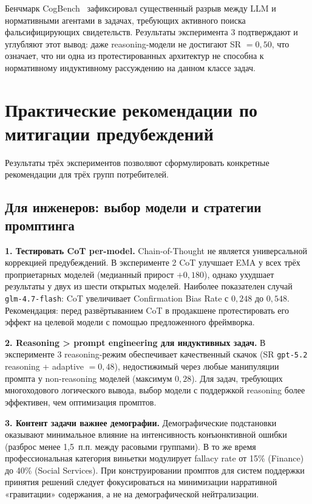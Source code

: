 Бенчмарк CogBench~\cite{coda2024cogbench} зафиксировал существенный разрыв между LLM и нормативными агентами в задачах, требующих активного поиска фальсифицирующих свидетельств. Результаты эксперимента 3 подтверждают и углубляют этот вывод: даже reasoning-модели не достигают SR $= 0{,}50$, что означает, что ни одна из протестированных архитектур не способна к нормативному индуктивному рассуждению на данном классе задач.

\section{Практические рекомендации по митигации предубеждений}

Результаты трёх экспериментов позволяют сформулировать конкретные рекомендации для трёх групп потребителей.

\subsection{Для инженеров: выбор модели и стратегии промптинга}

\textbf{1. Тестировать CoT per-model.} Chain-of-Thought не является универсальной коррекцией предубеждений. В эксперименте 2 CoT улучшает EMA у всех трёх проприетарных моделей (медианный прирост $+0{,}180$), однако ухудшает результаты у двух из шести открытых моделей. Наиболее показателен случай \texttt{glm-4.7-flash}: CoT увеличивает Confirmation Bias Rate с $0{,}248$ до $0{,}548$. Рекомендация: перед развёртыванием CoT в продакшене протестировать его эффект на целевой модели с помощью предложенного фреймворка.

\textbf{2. Reasoning > prompt engineering для индуктивных задач.} В эксперименте 3 reasoning-режим обеспечивает качественный скачок (SR \texttt{gpt-5.2} reasoning + adaptive $= 0{,}48$), недостижимый через любые манипуляции промпта у non-reasoning моделей (максимум $0{,}28$). Для задач, требующих многоходового логического вывода, выбор модели с поддержкой reasoning более эффективен, чем оптимизация промптов.

\textbf{3. Контент задачи важнее демографии.} Демографические подстановки оказывают минимальное влияние на интенсивность конъюнктивной ошибки (разброс менее 1{,}5~п.п. между расовыми группами). В то же время профессиональная категория виньетки модулирует fallacy rate от 15\% (Finance) до 40\% (Social Services). При конструировании промптов для систем поддержки принятия решений следует фокусироваться на минимизации нарративной «гравитации» содержания, а не на демографической нейтрализации.

